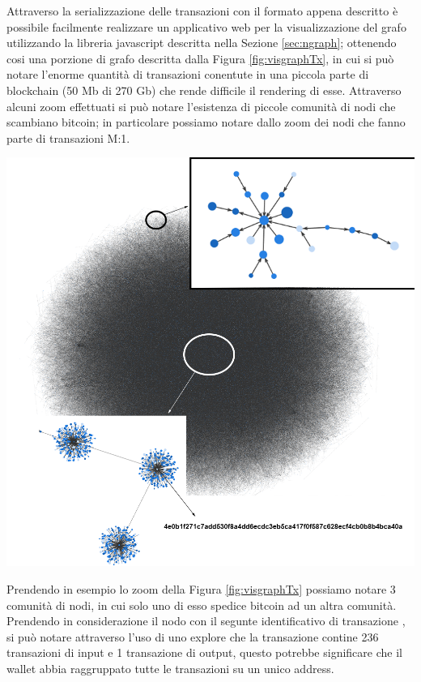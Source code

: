 Attraverso la serializzazione delle transazioni con il formato appena descritto è possibile facilmente realizzare un applicativo web per la visualizzazione del grafo utilizzando la libreria javascript descritta nella Sezione \ref{sec:ngraph}; ottenendo cosi una porzione di grafo descritta dalla Figura \ref{fig:visgraphTx}, in cui si può notare l'enorme quantità di transazioni conentute in una piccola parte di blockchain (50 Mb di 270 Gb) che rende difficile il rendering di esse.
Attraverso alcuni zoom effettuati si può notare l'esistenza di piccole comunità di nodi che scambiano bitcoin; in particolare possiamo notare dallo zoom  dei nodi che fanno parte di transazioni M:1.
\newpage
{\centering
\vspace{15pt}
\includegraphics[scale=1.2]{images/demo/graph_tx_demo_presentation.png}
\vspace{10pt}
\par}

\begin{example}
  Prendendo in esempio lo zoom  della Figura \ref{fig:visgraphTx} possiamo notare 3 comunità di nodi, in cui solo uno di esso spedice bitcoin ad un altra comunità.\\
  Prendendo in considerazione il nodo con il segunte identificativo di transazione , si può notare attraverso l'uso di uno explore che la transazione contine 236 transazioni di input e 1 transazione di output, questo potrebbe significare che il wallet abbia raggruppato tutte le transazioni su un unico address.
\end{example}

